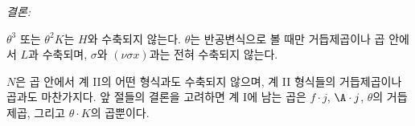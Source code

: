 
\noindent\emph{결론:}

$\theta^3$ 또는 $\theta^2K$는 $H$와 수축되지 않는다. $\theta$는 반공변식으로 볼 때만 거듭제곱이나 곱 안에서 $L$과 수축되며, $\sigma$와 $(\nu\sigma x)$과는 전혀 수축되지 않는다.

$N$은 곱 안에서 계 II의 어떤 형식과도 수축되지 않으며, 계 II 형식들의 거듭제곱이나 곱과도 마찬가지다. 앞 절들의 결론을 고려하면 계 I에 남는 곱은 $f\cdot j$, $\A\cdot j$, $\theta$의 거듭제곱, 그리고 $\theta\cdot K$의 곱뿐이다.
